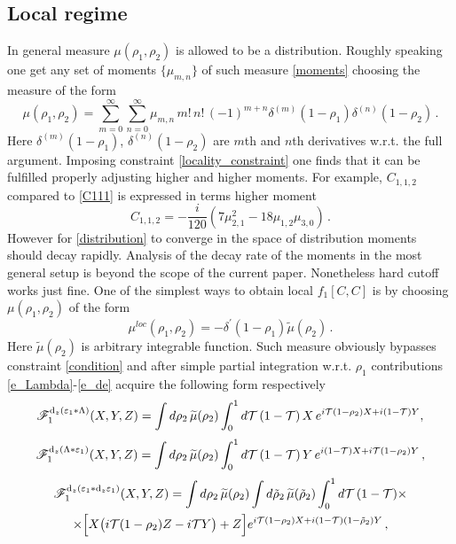 \documentclass[12pt]{article}
\newcommand{\dr}{{{\rm d}}}
\begin{document}
\subsection*{Local regime}
In general measure $\mu(\rho_1,\rho_2)$ is allowed to be a distribution. Roughly speaking one get any set of moments $\{\mu_{m,n}\}$ of such measure \eqref{moments} choosing the measure of the form
\begin{equation}\label{distribution}
\mu(\rho_1,\rho_2)=\sum_{m=0}^\infty \sum_{n=0}^\infty \mu_{m,n}\, m!\, n!\,(-1)^{m+n}\delta^{(m)}(1-\rho_1)\delta^{(n)}(1-\rho_2)\,.
\end{equation}
Here $\delta^{(m)}(1-\rho_1)$, $\delta^{(n)}(1-\rho_2)$ are $m$th and $n$th derivatives w.r.t. the full argument. Imposing constraint \eqref{locality_constraint} one finds that it can be fulfilled properly adjusting higher and higher moments. For example, $C_{1,1,2}$ compared to \eqref{C111} is expressed in terms higher moment
\begin{equation}
C_{1,1,2}=-\frac{i}{120}(7\mu_{2,1}^2-18\mu_{1,2}\mu_{3,0})\,.
\end{equation}  
However for \eqref{distribution} to converge in the space of distribution moments should decay rapidly. Analysis of the decay rate of the moments in the most general setup is beyond the scope of the current paper. Nonetheless hard cutoff works just fine. One of the simplest ways to obtain local $f_1[C,C]$ is by choosing $\mu(\rho_1,\rho_2)$ of the form
\begin{equation}\label{local_measure}
\mu^{loc}(\rho_1,\rho_2)=-\delta^\prime(1-\rho_1)\widetilde{\mu}(\rho_2)\,.
\end{equation}
Here $\widetilde{\mu}(\rho_2)$ is arbitrary integrable function. Such measure obviously  bypasses constraint \eqref{condition} and after simple partial integration w.r.t. $\rho_1$ contributions \eqref{e_Lambda}-\eqref{e_de} acquire the following form respectively
\begin{equation}
\mathscr{F}_1^{\dr_z(\varepsilon_1\ast\Lambda)}(X,Y,Z)=\int d\rho_2\,  \widetilde{\mu}(\rho_2)\int_0^1d\mathcal{T}\, (1-\mathcal{T})\, X\, e^{i\mathcal{T}(1-\rho_2)X+i(1-\mathcal{T})Y},
\end{equation} 
\begin{equation}
\mathscr{F}_1^{\dr_z(\Lambda\ast \varepsilon_1)}(X,Y,Z)=\int d\rho_2 \, \widetilde{\mu}(\rho_2)\int_0^1d\mathcal{T}\,(1-\mathcal{T})\,Y\, e^{i(1-\mathcal{T})X+i\mathcal{T}(1-\rho_2)Y}\,,
\end{equation}
\begin{multline}
\mathscr{F}_1^{\dr_z(\varepsilon_1\ast\dr_z\varepsilon_1)}(X,Y,Z)=\int d\rho_2 \, \widetilde{\mu}(\rho_2)\int d\tilde{\rho}_2\,   \widetilde{\mu}(\tilde{\rho}_2)\int_0^1 d\mathcal{T}\,(1-\mathcal{T})\times\\
\times\Big[X\big(i\mathcal{T}(1-\rho_2)Z-i\mathcal{T}Y\big)+Z\Big]e^{i\mathcal{T}(1-\rho_2)X+i(1-\mathcal{T})(1-\tilde{\rho}_2)Y}\,,
\end{multline}
\end{document}
